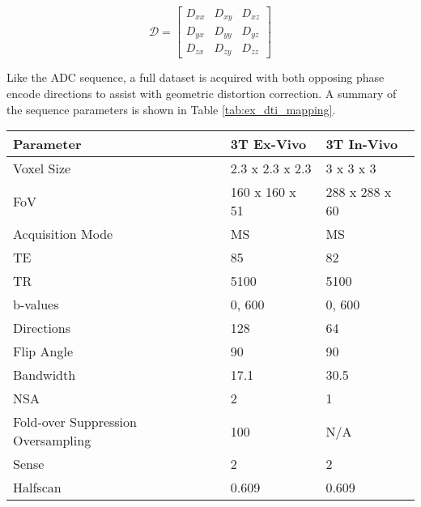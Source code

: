 \begin{equation}
	\mathscr{D} = 
	\begin{bmatrix}
		D_{xx} & D_{xy} & D_{xz}\\ 
		D_{yx} & D_{yy} & D_{yz}\\ 
		D_{zx} & D_{zy} & D_{zz}
	\end{bmatrix}
\label{eq:ex_diffusion_tensor}
\end{equation}

Like the \ac{ADC} sequence, a full dataset is acquired with both opposing phase encode directions to assist with geometric distortion correction. A summary of the sequence parameters is shown in Table \ref{tab:ex_dti_mapping}. 

\begin{table}[H]
	\centering
	\begin{tabularx}{1.0\textwidth}{|X|X|X|}
		\hline
		Parameter                          & 3T Ex-Vivo      & 3T In-Vivo          \\ \hline
		Voxel Size                         & 2.3 x 2.3 x 2.3 & 3 x 3 x 3           \\ \hline
		FoV                                & 160 x 160 x 51  & 288 x 288 x 60      \\ \hline
		Acquisition Mode                   & MS              & MS                  \\ \hline
		TE                                 & 85              & 82                  \\ \hline
		TR                                 & 5100            & 5100                \\ \hline
		b-values                           & 0, 600          & 0, 600              \\ \hline
		Directions                         & 128             & 64                  \\ \hline
		Flip Angle                         & 90              & 90                  \\ \hline
		Bandwidth                          & 17.1            & 30.5                \\ \hline
		NSA                                & 2               & 1                   \\ \hline
		Fold-over Suppression Oversampling & 100             & N/A                 \\ \hline
		Sense                              & 2               & 2                   \\ \hline
		Halfscan                           & 0.609           & 0.609               \\ \hline

\end{tabularx}
\end{table}
